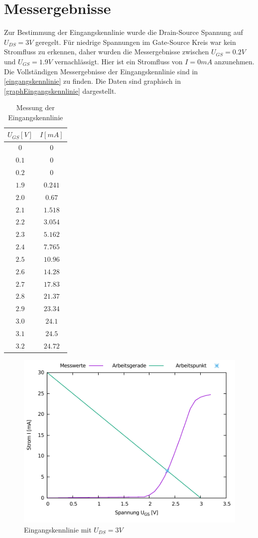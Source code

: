 \documentclass[11pt, a4paper]{article}
\begin{document}
\section*{Messergebnisse}
Zur Bestimmung der Eingangskennlinie wurde die Drain-Source Spannung auf $U_{DS} = 3 V$ geregelt. Für niedrige Spannungen im Gate-Source Kreis war kein Stromfluss zu erkennen, daher wurden die Messergebnisse zwischen $U_{GS} = 0.2 V$ und $U_{GS} = 1.9 V$
vernachlässigt. Hier ist ein Stromfluss von $I = 0 mA$ anzunehmen. Die Vollständigen Messergebnisse der Eingangskennlinie sind in \autoref{eingangskennlinie} zu finden. Die Daten sind graphisch in \autoref{graphEingangskennlinie} dargestellt.
\begin{table}[h]
\centering
\begin{tabular}{c|c}
$U_{GS} [V]$ & $I [mA]$ \\ \hline
$0$ 	& $0$ \\
$0.1$ 	& $0$ \\
$0.2$ 	& $0$ \\
$1.9$	& $0.241$ \\
$2.0$	& $0.67$ \\
$2.1$	& $1.518$ \\
$2.2$	& $3.054$ \\
$2.3$	& $5.162$ \\
$2.4$	& $7.765$ \\
$2.5$	& $10.96$ \\
$2.6$	& $14.28$ \\
$2.7$	& $17.83$ \\
$2.8$	& $21.37$ \\
$2.9$	& $23.34$ \\
$3.0$	& $24.1$ \\
$3.1$	& $24.5$ \\
$3.2$	& $24.72$
\end{tabular}
\caption{Messung der Eingangskennlinie}
\label{eingangskennlinie}
\end{table}
\begin{figure}[H]
    \centering
    \includegraphics[width=\linewidth]{eingang.pdf}
    \caption{Eingangskennlinie mit $U_{DS}=3V$}
    \label{graphEingangskennlinie}
\end{figure}
\end{document}
